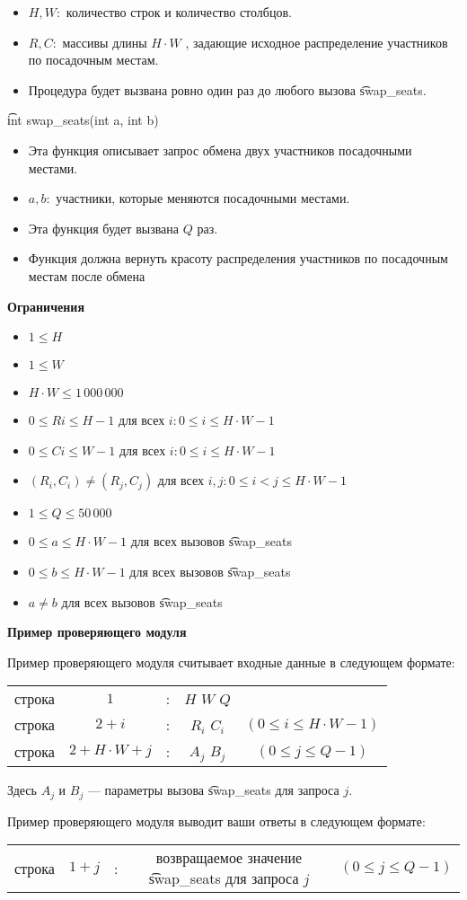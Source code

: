 \begin{itemize}
\item $ H, W: $ количество строк и количество столбцов. 
\item $ R, C: $ массивы длины $ H \cdot W $ , задающие исходное распределение участников по посадочным местам.
\item Процедура будет вызвана ровно один раз до любого вызова \t{swap_seats}.
\end{itemize}

\t{int swap_seats(int a, int b) }

\begin{itemize}
\item Эта функция описывает запрос обмена двух участников посадочными местами.
\item $ a, b: $ участники, которые меняются посадочными местами. 
\item Эта функция будет вызвана $Q$ раз. 
\item Функция должна вернуть красоту распределения участников по посадочным местам после обмена
\end{itemize}

\bf{Ограничения }

\begin{itemize}
\item $ 1 \le H $ 
\item $ 1 \le W $ 
\item $ H \cdot W \le 1\,000\,000 $ 
\item $ 0 \le Ri \le H-1 $ для всех $ i: 0 \le i \le H \cdot W-1 $ 
\item $ 0 \le Ci \le W-1 $ для всех $ i: 0 \le i \le H \cdot W-1 $ 
\item $ (R_i, C_i) \neq (R_j, C_j) $ для всех $ i, j: 0 \le i < j \le H \cdot W-1 $ 
\item $ 1 \le Q \le 50\,000 $ 
\item $ 0 \le a \le H \cdot W -1 $ для всех вызовов \t{swap_seats}
\item $ 0 \le b \le H \cdot W -1 $ для всех вызовов \t{swap_seats}
\item $ a \neq b $ для всех вызовов \t{swap_seats}
\end{itemize}

\bf{Пример проверяющего модуля}

Пример проверяющего модуля считывает входные данные в следующем формате:

\begin{tabular}{ccccc}
строка& $ 1 $ &:& $H$ $W$ $Q$ &\\
строка& $ 2+i $ &:& $R_i$ $C_i$ & $ (0 \le i \le H \cdot W-1) $ \\
строка& $ 2+H \cdot W+j $ &:& $A_j$ $B_j$ & $ (0 \le j \le Q-1) $ \\
\end{tabular}

Здесь $ A_j $ и $ B_j $ --- параметры вызова \t{swap_seats} для запроса $ j.$

Пример проверяющего модуля выводит ваши ответы в следующем формате:

\begin{tabular}{ccccc}
строка& $ 1+j $ &:&возвращаемое значение \t{swap_seats} для запроса $ j $ & $ (0 \le j \le Q-1) $ 
\end{tabular}
